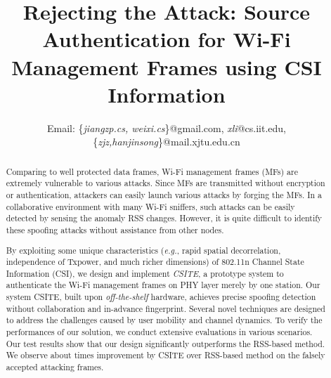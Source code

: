 \documentclass[conference]{IEEEtran}
\def\eg{\textit{e.g.}\xspace}
\begin{document}
\title{Rejecting the Attack: Source Authentication for Wi-Fi Management Frames using CSI Information}

\author{
Email: \{\emph{jiangzp.cs, weixi.cs}\}@gmail.com, \emph{xli}@cs.iit.edu, \{\emph{zjz,hanjinsong}\}@mail.xjtu.edu.cn}


\maketitle

\begin{abstract}

Comparing to well protected data frames, Wi-Fi management frames (MFs)
 are extremely vulnerable to various attacks.
Since MFs are transmitted without encryption or authentication,
attackers can easily launch various attacks by forging the MFs.
In a collaborative environment with many Wi-Fi sniffers, such attacks can be easily detected by sensing the anomaly RSS changes.
However, it is quite difficult to identify these spoofing attacks without assistance from other nodes.

By exploiting some unique characteristics (\eg,
 rapid spatial decorrelation, independence  of Txpower, and much
 richer dimensions)  of 802.11n Channel State Information
 (CSI), we design and implement \emph{CSITE}, a prototype system to authenticate the Wi-Fi management frames on PHY layer merely by one station.
Our system CSITE, built upon \textit{off-the-shelf} hardware,
 achieves precise spoofing detection without collaboration and
 in-advance fingerprint.
Several novel techniques are designed to address the challenges
 caused by user mobility and channel dynamics.
To verify the performances of our solution, we conduct extensive evaluations in various
 scenarios.
Our test results show that our design significantly outperforms the
 RSS-based method. We observe about  times improvement by CSITE over RSS-based method
 on the falsely accepted attacking frames.



\end{abstract}
\end{document}
